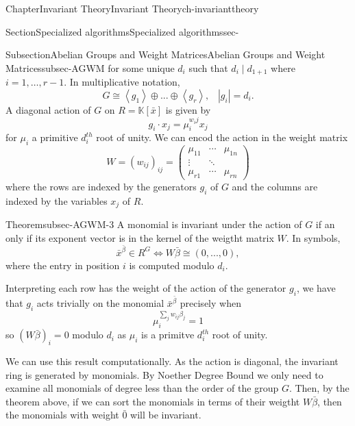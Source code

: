 \documentclass[oneside,10pt,]{book}
\newcommand{\amp}{&}
\begin{document}
\begin{chapterptx}{Chapter}{Invariant Theory}{}{Invariant Theory}{}{}{ch-invarianttheory}
\begin{sectionptx}{Section}{Specialized algorithms}{}{Specialized algorithms}{}{}{sec-}
\begin{subsectionptx}{Subsection}{Abelian Groups and Weight Matrices}{}{Abelian Groups and Weight Matrices}{}{}{subsec-AGWM}
for some unique \(d_i\) such that \(d_i \mid d_{1+1}\) where \(i=1, \ldots , r-1\). In multiplicative notation,%
\begin{equation*}
G \cong \left\langle g_1\right\rangle \oplus...\oplus\left\langle g_r \right\rangle, \,\,\,\,\, |g_i| =d_i.
\end{equation*}
A diagonal action of \(G\) on \(R= \mathbb{K}[\bar x]\) is given by%
\begin{equation*}
g_i \cdot x_j = \mu_i^{w_ij}x_j
\end{equation*}
for \(\mu_i \) a primitive \(d_i^{th}\) root of unity. We can encod the action in the weight matrix%
\begin{equation*}
W = (w_{ij})_{ij} =  
\begin{pmatrix}
\mu_{11} \amp \cdots     \amp   \mu_{1n}   \\
\vdots \amp \ddots \amp      \\
\mu_{r1}  \amp    \cdots     \amp   \mu_{rn}  
\end{pmatrix}
\end{equation*}
where the rows are indexed by the generators \(g_i\) of \(G\) and the columns are indexed by the variables \(x_j\) of \(R\).%
\begin{theorem}{Theorem}{}{}{subsec-AGWM-3}%
A monomial is invariant under the action of \(G\) if an only if its exponent vector is in the kernel of the weigtht matrix \(W \). In symbols,%
\begin{equation*}
\bar x^{\bar \beta} \in R^G \iff W \bar \beta \cong (0,...,0),
\end{equation*}
where the entry in position \(i\) is computed modulo \(d_i\).%
\end{theorem}
Interpreting each row has the weight of the action of the generator \(g_i\), we have that \(g_i\) acts trivially on the monomial \(\bar x^{\bar \beta}\) precisely when%
\begin{equation*}
\mu_i^{\sum_j w_{ij} \beta_j} = 1
\end{equation*}
so \((W \bar \beta)_i =0\) modulo \(d_i\) as \(\mu_i\) is a primitve \(d_i^{th}\) root of unity.%
\par
We can use this result computationally. As the action is diagonal, the invariant ring is generated by monomials. By Noether Degree Bound we only need to examine all monomials of degree less than the order of the group \(G\). Then, by the theorem above, if we can sort the monomials in terms of their weigtht \(W\bar \beta\), then the monomials with weight \(\bar 0\) will be invariant.%
\end{subsectionptx}

\end{sectionptx}
\end{chapterptx}
\end{document}
